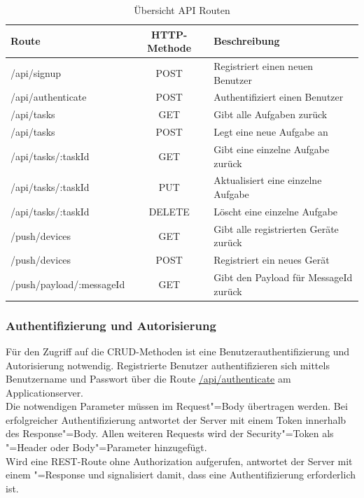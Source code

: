 \begin{table}[h]
\centering
\begin{tabular}{l | c | l }
    \textbf{Route} & \textbf{HTTP-Methode} & \textbf{Beschreibung} \\
    \hline\hline
    /api/signup & POST & Registriert einen neuen Benutzer \\
    /api/authenticate & POST & Authentifiziert einen Benutzer \\
    \hline
    /api/tasks & GET & Gibt alle Aufgaben zurück \\
    /api/tasks & POST & Legt eine neue Aufgabe an \\
    /api/tasks/:taskId & GET & Gibt eine einzelne Aufgabe zurück \\
    /api/tasks/:taskId & PUT & Aktualisiert eine einzelne Aufgabe \\
    /api/tasks/:taskId & DELETE & Löscht eine einzelne Aufgabe \\
    \hline
    /push/devices & GET & Gibt alle registrierten Geräte zurück \\
    /push/devices & POST & Registriert ein neues Gerät \\
    /push/payload/:messageId & GET & Gibt den Payload für MessageId zurück \\
\end{tabular}
\caption{Übersicht API Routen}
\label{tbl_konzeption_rest}
\end{table}

\subsubsection{Authentifizierung und Autorisierung} 

Für den Zugriff auf die CRUD-Methoden ist eine Benutzerauthentifizierung und Autorisierung notwendig. Registrierte Benutzer authentifizieren sich mittels Benutzername und Passwort über die Route \url{/api/authenticate} am Applicationserver. \\
Die notwendigen Parameter müssen im Request"=Body übertragen werden. Bei erfolgreicher Authentifizierung antwortet der Server mit einem Token innerhalb des Response"=Body. Allen weiteren Requests wird der Security"=Token als "=Header oder Body"=Parameter hinzugefügt. \\
Wird eine REST-Route ohne Authorization aufgerufen, antwortet der Server mit einem "=Response und signalisiert damit, dass eine Authentifizierung erforderlich ist. 


